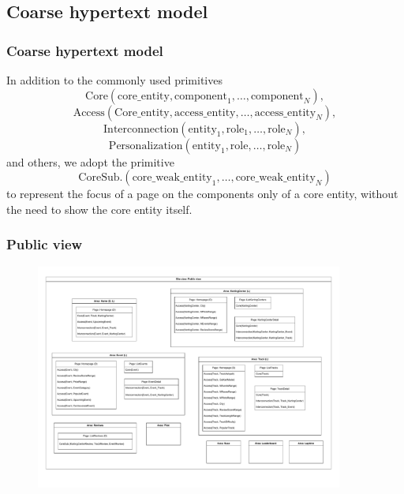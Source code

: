 \documentclass{beamer}
\begin{document}
\subsection{Coarse hypertext model}

\begin{frame}
    \frametitle{Coarse hypertext model}
    In addition to the commonly used primitives
        $$\text{Core}(\text{core\_entity},\text{component}_1,\dots,\text{component}_N),$$
        $$\text{Access}(\text{Core\_entity},\text{access\_entity},\dots,\text{access\_entity}_N),$$
        $$\text{Interconnection}(\text{entity}_1, \text{role}_1, \dots, \text{role}_N),$$
        $$\text{Personalization}(\text{entity}_1, \text{role}, \dots, \text{role}_N)$$
        and others, we adopt the primitive 
    $$ \text{CoreSub.}(\text{core\_weak\_entity}_1,\dots,\text{core\_weak\_entity}_N) $$
    to represent the focus of a page on the components only of a core entity, without the need to show the core entity itself.
\end{frame}

\begin{frame}
    \frametitle{Public view}
    \begin{figure}
        \centering
        \includegraphics[width=0.9\textwidth]{drawio/public-view.pdf}
    \end{figure}
\end{frame}
\end{document}
